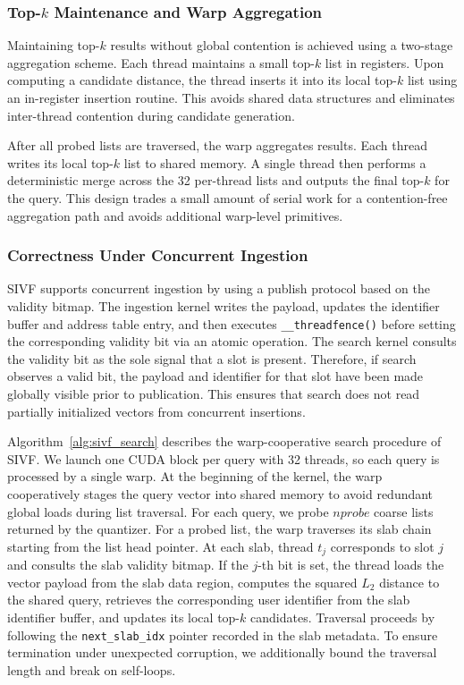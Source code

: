 \documentclass[sigconf,nonacm]{acmart}
\theoremstyle{plain}
\theoremstyle{definition}
\theoremstyle{remark}
\begin{document}
\subsubsection{Top-$k$ Maintenance and Warp Aggregation}

Maintaining top-$k$ results without global contention is achieved using a two-stage aggregation scheme. Each thread maintains a small top-$k$ list in registers. Upon computing a candidate distance, the thread inserts it into its local top-$k$ list using an in-register insertion routine. This avoids shared data structures and eliminates inter-thread contention during candidate generation.

After all probed lists are traversed, the warp aggregates results. Each thread writes its local top-$k$ list to shared memory. A single thread then performs a deterministic merge across the 32 per-thread lists and outputs the final top-$k$ for the query. This design trades a small amount of serial work for a contention-free aggregation path and avoids additional warp-level primitives.

\subsubsection{Correctness Under Concurrent Ingestion}

SIVF supports concurrent ingestion by using a publish protocol based on the validity bitmap. The ingestion kernel writes the payload, updates the identifier buffer and address table entry, and then executes \verb|__threadfence()| before setting the corresponding validity bit via an atomic operation. The search kernel consults the validity bit as the sole signal that a slot is present. Therefore, if search observes a valid bit, the payload and identifier for that slot have been made globally visible prior to publication. This ensures that search does not read partially initialized vectors from concurrent insertions.

Algorithm~\ref{alg:sivf_search} describes the warp-cooperative search procedure of SIVF. 
We launch one CUDA block per query with 32 threads, so each query is processed by a single warp. 
At the beginning of the kernel, the warp cooperatively stages the query vector into shared memory to avoid redundant global loads during list traversal. 
For each query, we probe $nprobe$ coarse lists returned by the quantizer. 
For a probed list, the warp traverses its slab chain starting from the list head pointer. 
At each slab, thread $t_j$ corresponds to slot $j$ and consults the slab validity bitmap. 
If the $j$-th bit is set, the thread loads the vector payload from the slab data region, computes the squared $L_2$ distance to the shared query, retrieves the corresponding user identifier from the slab identifier buffer, and updates its local top-$k$ candidates. 
Traversal proceeds by following the \texttt{next\_slab\_idx} pointer recorded in the slab metadata. 
To ensure termination under unexpected corruption, we additionally bound the traversal length and break on self-loops.
\end{document}
